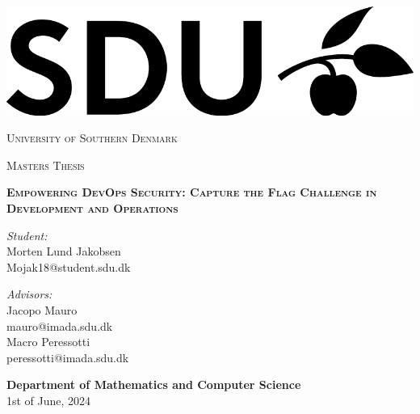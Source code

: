 \begin{titlepage}

	\begin{center}
		\includegraphics[scale=0.7]{images/SDU_logo.png}
	\end{center}

	\thispagestyle{fancy}

	\center

	\textsc{\large University of Southern Denmark} \\
	\vspace{0.3cm}

	\textsc{\large Masters Thesis}

	\vspace{0.3cm}

	\noindent\makebox[\linewidth]{\rule{\linewidth}{1.2pt}}
	\textsc{\textbf{Empowering DevOps Security: Capture the Flag Challenge in Development and Operations}}
	\noindent\makebox[\linewidth]{\rule{\linewidth}{1.2pt}}

	\vspace{0.5in}

	\begin{minipage}{0.48\textwidth}
		\begin{flushleft}
			\textit{Student:} \\
			Morten Lund Jakobsen \\
			Mojak18@student.sdu.dk
		\end{flushleft}
	\end{minipage}
	\begin{minipage}{0.48\textwidth}
		\begin{flushright}
			\textit{Advisors:} \\
			Jacopo Mauro \\
			mauro@imada.sdu.dk \\
			Macro Peressotti \\
			peressotti@imada.sdu.dk \\
		\end{flushright}
	\end{minipage}

	\vspace{2in}

	\textbf{\large Department of Mathematics and Computer Science} \\

	{\large 1st of June, 2024}
	\thispagestyle{empty}

\end{titlepage}
